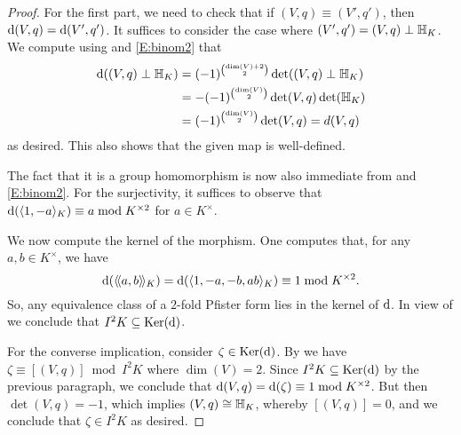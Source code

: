 \documentclass[12pt, leqno, british]{amsart}
\begin{document}
\begin{proof}
For the first part, we need to check that if $(V, q) \equiv (V', q')$, then $\mathrm{d}(V, q) = \mathrm{d}(V', q')$.
It suffices to consider the case where $(V', q') = (V, q) \perp \mathbb{H}_K$.
We compute using  and \cref{E:binom2} that
\begin{align*}
\mathrm{d}((V, q) \perp \mathbb{H}_K) &= (-1)^{\binom{\dim(V)+2}{2}}\det((V, q) \perp \mathbb{H}_K ) \\
&= - (-1)^{\binom{\dim(V)}{2}} \det(V, q) \det(\mathbb{H}_K) \\
&= (-1)^{\binom{\dim(V)}{2}} \det(V, q) = d(V, q)
\end{align*}
as desired.
This also shows that the given map is well-defined.

The fact that it is a group homomorphism is now also immediate from  and \cref{E:binom2}.
For the surjectivity, it suffices to observe that $\mathrm{d}(\langle 1, -a \rangle_K) \equiv a \bmod K^{\times 2}$ for $a \in K^\times$.

We now compute the kernel of the morphism.
One computes that, for any $a, b \in K^\times$, we have
$$ \mathrm{d}(\langle\!\langle a, b \rangle\!\rangle_K) = \mathrm{d}(\langle 1, -a, -b, ab \rangle_K) \equiv 1 \bmod K^{\times 2}.$$
So, any equivalence class of a $2$-fold Pfister form lies in the kernel of $\mathrm{d}$.
In view of  we conclude that $I^2K \subseteq \operatorname{Ker}(\mathrm{d})$.

For the converse implication, consider $\zeta \in \operatorname{Ker}(\mathrm{d})$.
By  we have $\zeta \equiv [(V, q)] \bmod I^2K$ where $\dim(V) = 2$.
Since $I^2K \subseteq \operatorname{Ker}(\mathrm{d})$ by the previous paragraph, we conclude that $\mathrm{d}(V, q) = \mathrm{d}(\zeta) \equiv 1 \bmod K^{\times 2}$.
But then $\det(V, q) = -1$, which implies $(V, q) \cong \mathbb{H}_K$, whereby $[(V, q)] = 0$, and we conclude that $\zeta \in I^2K$ as desired.
\end{proof}
\end{document}
